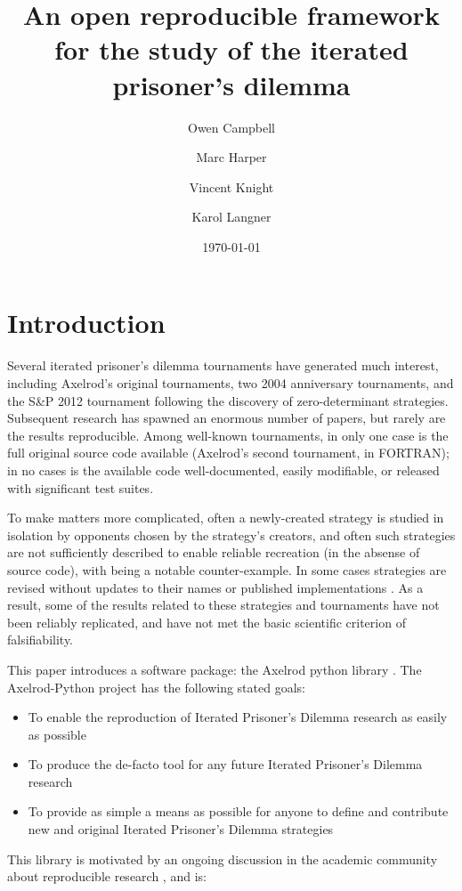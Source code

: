 \documentclass{article}
\title{An open reproducible framework for the study of the iterated prisoner's
dilemma}
\author{Owen Campbell\\
        \and
        Marc Harper\\
        \and
        Vincent Knight\\
        \and
        Karol Langner\\
}
\date{\today}
\begin{document}
\maketitle

\section{Introduction}\label{sec:introduction}

Several iterated prisoner's dilemma tournaments have generated much interest,
including Axelrod's original tournaments, two 2004 anniversary tournaments, and
the S&P 2012 tournament following the discovery of zero-determinant strategies.
Subsequent research has spawned an enormous number of papers, but rarely are the
results reproducible. Among well-known tournaments, in only one case is the full
original source code available (Axelrod's second tournament, in FORTRAN); in no
cases is the available code well-documented, easily modifiable, or released
with significant test suites.

To make matters more complicated, often a newly-created strategy is studied in
isolation by opponents chosen by the strategy's creators, and often such
strategies are not sufficiently described to enable reliable recreation
(in the absense of source code), with \cite{slany2007some} being a notable
counter-example. In some cases strategies are revised without updates to their
names or published implementations \cite{li2007design} \cite{li2011engineering}.
As a result, some of the results related to these strategies and tournaments
have not been reliably replicated, and have not met the basic scientific
criterion of falsifiability.

This paper introduces a software package: the Axelrod python library
\cite{Axelrod-Pythonprojectteam2015}. The Axelrod-Python project has the
following stated goals:

\begin{itemize}
    \item To enable the reproduction of Iterated Prisoner's Dilemma
    research as easily as possible
    \item To produce the de-facto tool for any future Iterated Prisoner's
    Dilemma research
    \item To provide as simple a means as possible for anyone to define and
    contribute new and original Iterated Prisoner's Dilemma strategies
\end{itemize}

This library is motivated by an ongoing discussion in the academic community
about reproducible research \cite{Crick2014a, Hong2015a, Prlic2012, Sandve2013},
and is:
\end{document}
